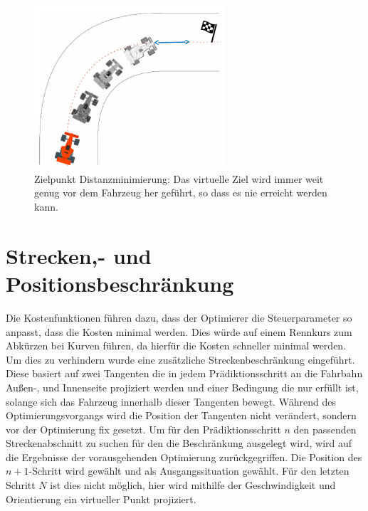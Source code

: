 \documentclass{like}
\begin{document}
\begin{figure}[ht!]
	\centering
	\includegraphics[width=200pt]{Abbildungen/cost_goal_dist.png}
	\caption{Zielpunkt Distanzminimierung: Das virtuelle Ziel wird immer weit genug vor dem Fahrzeug her geführt, so dass es nie erreicht werden kann.}
	\label{fig:costGoalDist}
\end{figure}


\section{Strecken,- und Positionsbeschränkung}
Die Kostenfunktionen führen dazu, dass der Optimierer die Steuerparameter so anpasst, dass die Kosten minimal werden. Dies würde auf einem Rennkurs zum Abkürzen bei Kurven führen, da hierfür die Kosten schneller minimal werden. Um dies zu verhindern wurde eine zusätzliche Streckenbeschränkung eingeführt. Diese basiert auf zwei Tangenten die in jedem Prädiktionsschritt an die Fahrbahn Außen-, und Innenseite projiziert werden und einer Bedingung die nur erfüllt ist, solange sich das Fahrzeug innerhalb dieser Tangenten bewegt. Während des Optimierungsvorgangs wird die Position der Tangenten nicht verändert, sondern vor der Optimierung fix gesetzt. Um für den Prädiktionsschritt \(n\) den passenden Streckenabschnitt zu suchen für den die Beschränkung ausgelegt wird, wird auf die Ergebnisse der vorausgehenden Optimierung zurückgegriffen. Die Position des $n+1$-Schritt wird gewählt und als Ausgangssituation gewählt. Für den letzten Schritt \(N\) ist dies nicht möglich, hier wird mithilfe der Geschwindigkeit und Orientierung ein virtueller Punkt projiziert.   
\end{document}
